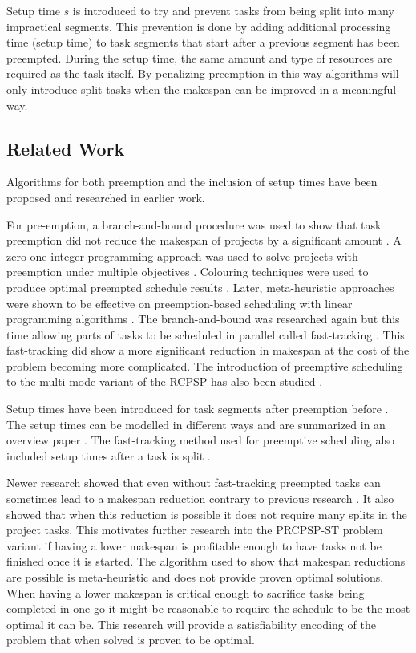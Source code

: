 Setup time \(s\) is introduced to try and prevent tasks from being split into many impractical segments. This prevention is done by adding additional processing time (setup time) to task segments that start after a previous segment has been preempted. During the setup time, the same amount and type of resources are required as the task itself. By penalizing preemption in this way algorithms will only introduce split tasks when the makespan can be improved in a meaningful way.


\subsection{Related Work}
Algorithms for both preemption and the inclusion of setup times have been proposed and researched in earlier work.

For pre-emption, a branch-and-bound procedure was used to show that task preemption did not reduce the makespan of projects by a significant amount \cite{RN21}. A zero-one integer programming approach was used to solve projects with preemption under multiple objectives \cite{RN54}. Colouring techniques were used to produce optimal preempted schedule results \cite{RN55}. Later, meta-heuristic approaches were shown to be effective on preemption-based scheduling with linear programming algorithms \cite{RN57, RN56}. The branch-and-bound was researched again but this time allowing parts of tasks to be scheduled in parallel called fast-tracking \cite{RN7}. This fast-tracking did show a more significant reduction in makespan at the cost of the problem becoming more complicated. The introduction of preemptive scheduling to the multi-mode variant of the RCPSP has also been studied \cite{RN61, RN59, RN60}.

Setup times have been introduced for task segments after preemption before \cite{RN13}. The setup times can be modelled in different ways and are summarized in an overview paper \cite{RN62}. The fast-tracking method used for preemptive scheduling also included setup times after a task is split \cite{RN7}.

Newer research showed that even without fast-tracking preempted tasks can sometimes lead to a makespan reduction contrary to previous research \cite{RN1}. It also showed that when this reduction is possible it does not require many splits in the project tasks. This motivates further research into the PRCPSP-ST problem variant if having a lower makespan is profitable enough to have tasks not be finished once it is started. The algorithm used to show that makespan reductions are possible is meta-heuristic and does not provide proven optimal solutions. When having a lower makespan is critical enough to sacrifice tasks being completed in one go it might be reasonable to require the schedule to be the most optimal it can be. This research will provide a satisfiability encoding of the problem that when solved is proven to be optimal.
